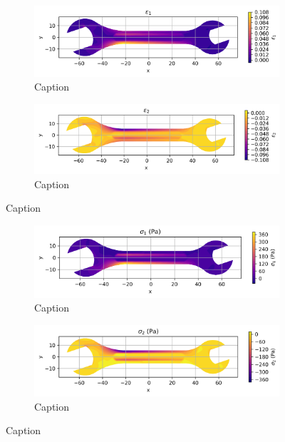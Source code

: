 \documentclass{article}  %
\begin{document}
\begin{figure}[H]
  \centering
  \begin{subfigure}[t]{0.49\textwidth}
    \centering
    \includegraphics[width=\textwidth]{GRAFICOS/Case c - epsilon_1.png}
    \caption{Caption}
    \label{fig:deformada_reacciones}
  \end{subfigure}
  \hfill
  \begin{subfigure}[t]{0.49\textwidth}
    \centering
    \includegraphics[width=\textwidth]{GRAFICOS/Case c - epsilon_2.png}
    \caption{Caption}
    \label{fig:von_mises}
  \end{subfigure}
  \caption{Caption}
  \label{fig:analisis_estructural}
\end{figure}

\begin{figure}[H]
  \centering
  \begin{subfigure}[t]{0.49\textwidth}
    \centering
    \includegraphics[width=\textwidth]{GRAFICOS/Case c - sigma_1.png}
    \caption{Caption}
    \label{fig:deformada_reacciones}
  \end{subfigure}
  \hfill
  \begin{subfigure}[t]{0.49\textwidth}
    \centering
    \includegraphics[width=\textwidth]{GRAFICOS/Case c - sigma_2.png}
    \caption{Caption}
    \label{fig:von_mises}
  \end{subfigure}
  \caption{Caption}
  \label{fig:analisis_estructural}
\end{figure}
\end{document}
